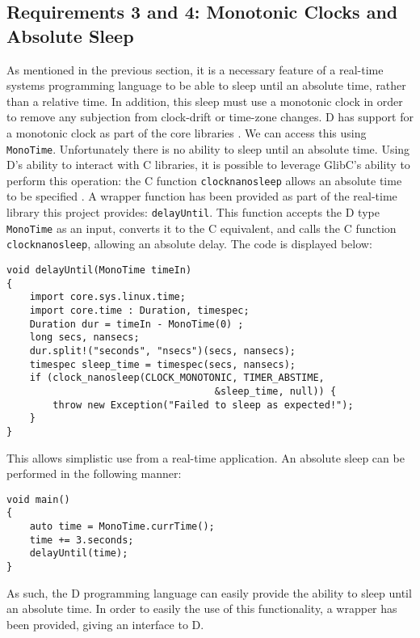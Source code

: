 \subsection{Requirements 3 and 4: Monotonic Clocks and Absolute Sleep}
As mentioned in the previous section, it is a necessary feature of a real-time 
systems programming language to be able to sleep until an absolute time, rather 
than a relative time. In addition, this sleep must use a monotonic clock in order 
to remove any subjection from clock-drift or time-zone changes. D has support 
for a monotonic clock as part of the core libraries 
\cite{dlang-core-time}. We can access this using 
\texttt{MonoTime}. Unfortunately there is no ability to sleep until an 
absolute time. Using D's ability to interact with C libraries, it is possible 
to leverage GlibC's ability to perform this operation: the C function 
\texttt{clock\textunderscore{}nanosleep} allows an absolute time to be specified
\cite{clock-nanosleep}.
A wrapper function has been provided as part of the real-time library this 
project provides: \texttt{delayUntil}.
This function accepts the D type \texttt{MonoTime} as an input, converts it to the C 
equivalent, and calls the C function \texttt{clock\textunderscore{}nanosleep}, 
allowing an absolute delay. The code is displayed below: 
\begin{lstlisting}
void delayUntil(MonoTime timeIn)
{
    import core.sys.linux.time; 
    import core.time : Duration, timespec; 
    Duration dur = timeIn - MonoTime(0) ;
    long secs, nansecs; 
    dur.split!("seconds", "nsecs")(secs, nansecs); 
    timespec sleep_time = timespec(secs, nansecs); 
    if (clock_nanosleep(CLOCK_MONOTONIC, TIMER_ABSTIME, 
                                    &sleep_time, null)) {
        throw new Exception("Failed to sleep as expected!"); 
    }
}
\end{lstlisting}
This allows simplistic use from a real-time application. An absolute sleep can 
be performed in the following manner: 
\begin{lstlisting}
void main()
{
    auto time = MonoTime.currTime(); 
    time += 3.seconds; 
    delayUntil(time);
}
\end{lstlisting}
As such, the D programming language can easily provide the ability to sleep 
until an absolute time. In order to easily the use of this functionality, a 
wrapper has been provided, giving an interface to D.


